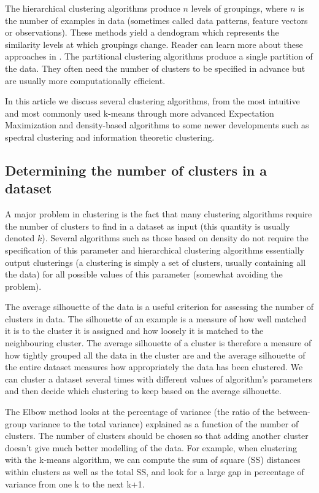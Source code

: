\documentclass[conference]{IEEEtran}
\begin{document}
The hierarchical clustering algorithms produce $n$ levels of groupings, where $n$ is
the number of examples in data (sometimes called data patterns, feature vectors or observations). These
methods yield a dendogram which represents the similarity levels at which groupings change.
Reader can learn more about these approaches in \cite{kononenko07}. The partitional
clustering algorithms produce a single partition of the data. They often need the number of clusters
to be specified in advance but are usually more computationally efficient.


In this article we discuss several clustering algorithms, from the most intuitive and most commonly
used k-means through more advanced Expectation Maximization and density-based algorithms
to some newer developments such as spectral clustering and information theoretic clustering.


\subsection{Determining the number of clusters in a dataset}
A major problem in clustering is the fact that many clustering algorithms require the
number of clusters to find in a dataset as input (this quantity is usually denoted $k$).
Several algorithms such as those based on density do not require the specification of this
parameter and hierarchical clustering algorithms essentially output clusterings (a clustering
is simply a set of clusters, usually containing all the data)
for all possible values of this parameter (somewhat avoiding the problem).

The average silhouette of the data is a useful criterion for assessing the number of clusters in data.
The silhouette of an example is a measure of how well matched it is to the cluster it is assigned
and how loosely it is matched to the neighbouring cluster. The average silhouette of a cluster
is therefore a measure of how tightly grouped all the data in the cluster are and the average silhouette of
the entire dataset measures how appropriately the data has been clustered. We can cluster a dataset
several times with different values of algorithm's parameters and then decide which clustering to keep based on
the average silhouette.

The Elbow method looks at the percentage of variance (the ratio of the between-group variance
to the total variance) explained as a function of the number of clusters.
The number of clusters should be chosen so that adding another cluster doesn't give much better modelling
of the data. For example, when clustering with the k-means algorithm, we can compute the sum of square (SS)
distances within clusters as well as the total SS, and look for a large gap in percentage of variance
from one k to the next k+1.
\end{document}
